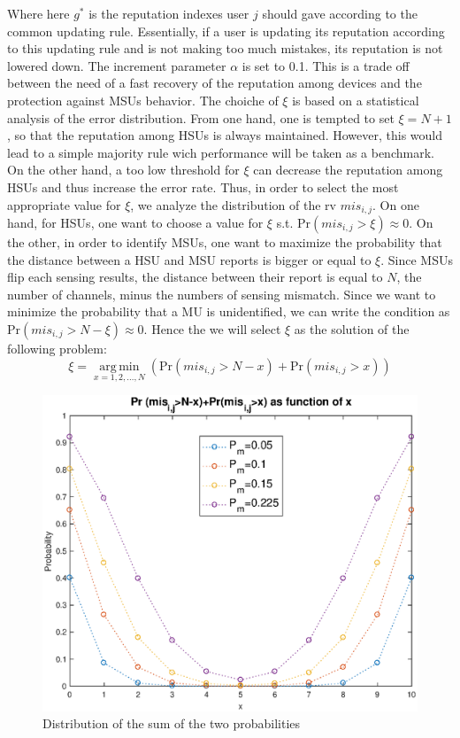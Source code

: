 \documentclass[letterpaper, 10 pt, conference]{ieeeconf}  %
\DeclareMathOperator*{\argmin}{arg\,min}
\begin{document}
Where here $g^*$ is the reputation indexes user $j$ should gave according to the common updating rule. Essentially, if a user is updating its reputation according to this updating rule and is not making too much mistakes, its reputation is not lowered down. The increment parameter $\alpha$ is set to 0.1. This is a trade off between the need of a fast recovery of the reputation among devices and the protection against MSUs behavior. The choiche of $\xi$ is based on a statistical analysis of the error distribution. From one hand, one is tempted to set $\xi=N+1$, so that the reputation among HSUs is always maintained. However, this would lead to a simple majority rule wich performance will be taken as a benchmark. On the other hand, a too low threshold for $\xi$ can decrease the reputation among HSUs and thus increase the error rate. Thus, in order to select the most appropriate value for $\xi$, we analyze the distribution of the rv $mis_{i,j}$. On one hand, for HSUs, one want to choose a value for $\xi$ s.t. Pr$(mis_{i,j}>\xi)\approx 0$. On the other, in order to identify MSUs, one want to maximize the probability that the distance between a HSU and MSU reports is bigger or equal to $\xi$. Since MSUs flip each sensing results, the distance between their report is equal to $N$, the number of channels, minus the numbers of sensing mismatch. Since we want to minimize the probability that a MU is unidentified, we can write the condition as Pr$(mis_{i,j}>N-\xi)\approx 0$. Hence the we will select $\xi$ as the solution of the following problem:
\begin{equation}
\xi=\argmin\limits_{x=1,2,\dots,N} (\text{Pr} (mis_{i,j}>N-x)+\text{Pr}(mis_{i,j}>x))
\end{equation}
\begin{figure}
\centering
\includegraphics[scale=0.4]{figures/prob.eps}
\caption{Distribution of the sum of the two probabilities}\label{probdist}
\end{figure}
\end{document}
